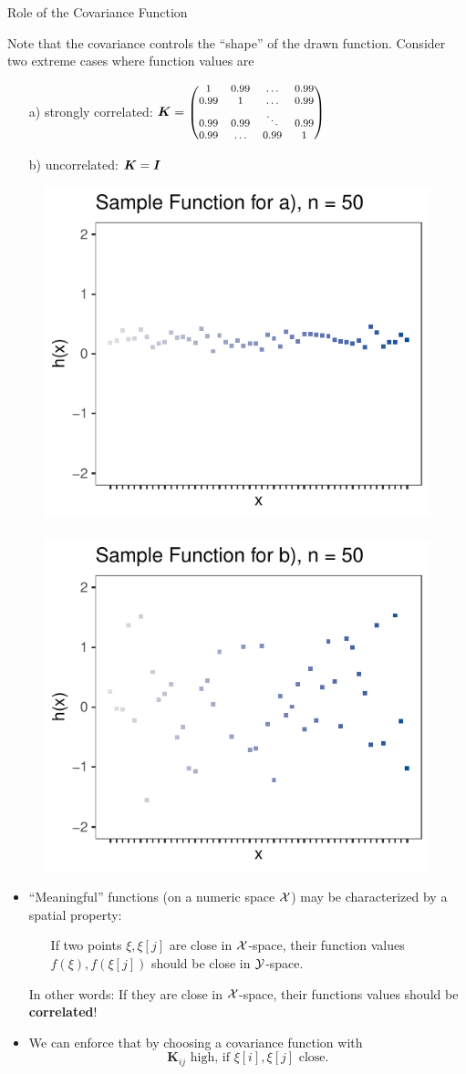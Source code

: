 \begin{vbframe}{Role of the Covariance Function}

Note that the covariance controls the \enquote{shape} of the drawn function. Consider two extreme cases where function values are

\begin{enumerate}
  \item[a)] strongly correlated: $\bm{K} = \begin{footnotesize}\begin{pmatrix} 1 & 0.99 & \dots & 0.99 \\
  0.99 & 1 & \dots & 0.99 \\
  0.99 & 0.99 & \ddots & 0.99 \\
  0.99 & \dots & 0.99 & 1 \end{pmatrix}\end{footnotesize}$
  \item[b)] uncorrelated: $\bm{K} = \boldsymbol{I}$
\end{enumerate}

\begin{figure}
  \includegraphics[width=0.35\linewidth]{figure_man/discrete/example_extreme_50-1.pdf} ~~  \includegraphics[width=0.35\linewidth]{figure_man/discrete/example_extreme_50-2.pdf}
\end{figure}


\framebreak 

\begin{itemize}
  \item \enquote{Meaningful} functions (on a numeric space $\mathcal{X}$) may be characterized by a spatial property: \vspace*{0.2cm}
  \begin{itemize}
    \item[] If two points $\xi, \xi[j]$ are close in $\mathcal{X}$-space, their function values $f(\xi), f(\xi[j])$ should be close in $\mathcal{Y}$-space. 
  \end{itemize} \vspace*{0.2cm}
  In other words: If they are close in $\mathcal{X}$-space, their functions values should be \textbf{correlated}! \vspace*{0.4cm}
  \item We can enforce that by choosing a covariance function with  
  $$
    \bm{K}_{ij} \text{ high, if } \xi[i], \xi[j] \text{ close.}
  $$


\end{itemize}
\end{vbframe}
